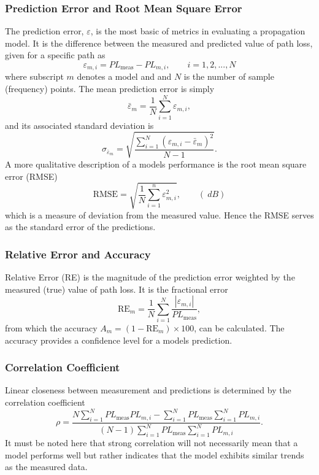 \documentclass[10pt,journal,twoside]{IEEEtran}
\begin{document}
\subsubsection{Prediction Error and Root Mean Square Error}
The prediction error, $\varepsilon$, is the most basic of metrics in evaluating a propagation  model. It is the difference between the measured %
and predicted value of path loss, given for a specific path as
\begin{equation}
	\label{eq:pred_error1}
	\varepsilon_{m,i}  = PL_{\text{meas}} - PL_{m,i}, \qquad i = 1,2,...,N
\end{equation}
where subscript $m$ denotes a model and and $N$ is the number of sample (frequency) points. %
The mean prediction error is simply
\begin{equation}
\bar\varepsilon_m  = \dfrac{1}{N}\sum_{i=1}^{N}\varepsilon_{m,i},
\end{equation}
and its associated standard deviation is 
\begin{equation}
\sigma_{\bar\varepsilon_m} = \sqrt{ \dfrac{\sum_{i=1}^{N} \left( \varepsilon_{m,i} - \bar\varepsilon_m \right)^2}{N-1} }.
\end{equation}
A more qualitative description of a models performance is the root mean square error (RMSE)
\begin{equation}
	\label{eq:rmse}
	\text{RMSE} = \sqrt{\dfrac{1}{N}\sum\limits_{i=1}^n \varepsilon_{m,i}^2}, \qquad (\SI{}{dB})
\end{equation}
which is a measure of deviation from the measured value. Hence the RMSE serves as the standard error of the predictions. 
%
\subsubsection{Relative Error and Accuracy}
Relative Error (RE) is the magnitude of the prediction error weighted by the measured (true) value of path loss. It is the fractional error
\begin{equation}
	\text{RE}_m = \dfrac{1}{N}\sum_{i=1}^{N}\dfrac{\left|\varepsilon_{m,i}\right|} {PL_{\text{meas}}},
\end{equation}
from which the accuracy $A_m = (1 - \text{RE}_m)\times 100$, can be calculated. The accuracy provides a confidence level for a models prediction.
%
\subsubsection{Correlation Coefficient}
Linear closeness between measurement and predictions is determined by the correlation coefficient
\begin{equation}
	\rho = \dfrac{ \displaystyle N\sum_{i=1}^{N} PL_{\text{meas}} PL_{m,i} - \sum_{i=1}^{N} PL_{\text{meas}} \sum_{i=1}^{N} PL_{m,i} } { \displaystyle \left( N-1 \right) \sum_{i=1}^{N} PL_{\text{meas}} \sum_{i=1}^{N} PL_{m,i} }.
\end{equation}
It must be noted here that strong correlation will not necessarily mean that a model performs well but rather indicates that the model exhibits similar trends as the measured data.
%
\end{document}
